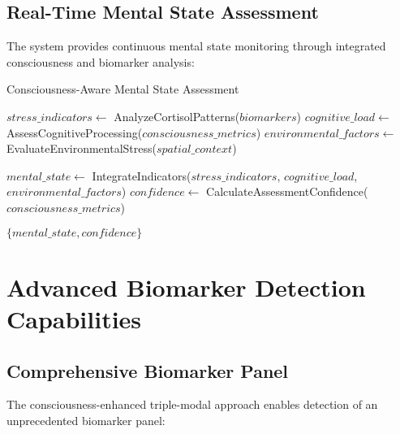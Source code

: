 \documentclass[12pt,a4paper]{article}
\begin{document}
\subsection{Real-Time Mental State Assessment}

The system provides continuous mental state monitoring through integrated consciousness and biomarker analysis:

\begin{algorithm}
\caption{Consciousness-Aware Mental State Assessment}
\begin{algorithmic}[1]
    \State $stress\_indicators \gets$ AnalyzeCortisolPatterns($biomarkers$)
    \State $cognitive\_load \gets$ AssessCognitiveProcessing($consciousness\_metrics$)
    \State $environmental\_factors \gets$ EvaluateEnvironmentalStress($spatial\_context$)
    
    \State $mental\_state \gets$ IntegrateIndicators($stress\_indicators$, $cognitive\_load$, $environmental\_factors$)
    \State $confidence \gets$ CalculateAssessmentConfidence($consciousness\_metrics$)
    
    \State \Return $\{mental\_state, confidence\}$
\EndProcedure
\end{algorithmic}
\end{algorithm}

\section{Advanced Biomarker Detection Capabilities}

\subsection{Comprehensive Biomarker Panel}

The consciousness-enhanced triple-modal approach enables detection of an unprecedented biomarker panel:
\end{document}
